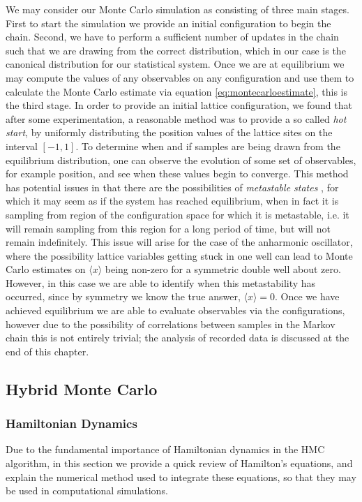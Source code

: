 \documentclass[12pt]{article}
\begin{document}
    We may consider our Monte Carlo simulation as consisting of three main stages. First to start the simulation we provide an initial configuration to begin the chain. Second, we have to perform a sufficient number of updates in the chain such that we are drawing from the correct distribution, which in our case is the canonical distribution for our statistical system. Once we are at equilibrium we may compute the values of any observables on any configuration and use them to calculate the Monte Carlo estimate via equation \ref{eq:montecarloestimate}, this is the third stage. In order to provide an initial lattice configuration, we found that after some experimentation, a reasonable method was to provide a so called \textit{hot start}, by uniformly distributing the position values of the lattice sites on the interval $\left[-1,1\right]$. To determine when and if samples are being drawn from the equilibrium distribution, one can observe the evolution of some set of observables, for example position, and see when these values begin to converge. This method has potential issues in that there are the possibilities of \textit{metastable states} \cite{sokal_1997}, for which it may seem as if the system has reached equilibrium, when in fact it is sampling from region of the configuration space for which it is metastable, i.e. it will remain sampling from this region for a long period of time, but will not remain indefinitely. This issue will arise for the case of the anharmonic oscillator, where the possibility lattice variables getting stuck in one well can lead to Monte Carlo estimates on $\langle x \rangle$ being non-zero for a symmetric double well about zero. However, in this case we are able to identify when this metastability has occurred, since by symmetry we know the true answer, $\langle x \rangle = 0$. Once we have achieved equilibrium we are able to evaluate observables via the configurations, however due to the possibility of correlations between samples in the Markov chain this is not entirely trivial; the analysis of recorded data is discussed at the end of this chapter.



    \subsection{Hybrid Monte Carlo}
        \subsubsection{Hamiltonian Dynamics}
            \label{sec:HamiltonianDynamics}
            Due to the fundamental importance of Hamiltonian dynamics in the HMC algorithm, in this section we provide a quick review of Hamilton's equations, and explain the numerical method used to integrate these equations, so that they may be used in computational simulations.
\end{document}
